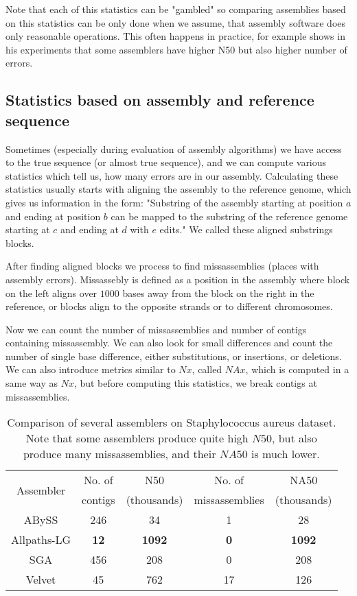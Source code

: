 Note that each of this statistics can be "gambled" so comparing assemblies based
on this statistics can be only done when we assume, that assembly software does only
reasonable operations. This often happens in practice, for example
\citet{gage} shows in his experiments that some assemblers have
higher N50 but also higher number of errors. 

\subsection{Statistics based on assembly and reference sequence}

Sometimes (especially during evaluation of assembly algorithms) we have access to 
the true sequence
(or almost true sequence), and we can compute various statistics which tell us, how many
errors are in our assembly.
Calculating these statistics usually starts with aligning the assembly to the
reference genome, which
gives us information in the form:
"Substring of the assembly starting at position $a$ and ending at position $b$ can be mapped
to the substring of the reference genome starting at $c$ and ending at $d$ with $e$ edits."
We called these aligned substrings blocks. 

After finding aligned blocks we process to find missassemblies (places with assembly errors).
Missassebly \citep{Quast} is defined as a position in the assembly where block on the left
aligns over $1000$ bases away from the block on the right in the reference,
or blocks align to the opposite strands or to different chromosomes.

Now we can count the number of missassemblies and number of contigs containing missassembly.
We can also look for small differences and count the number of single base difference, either
substitutions, or insertions, or deletions. 
We can also introduce metrics similar to $Nx$, called $NAx$, which is computed in a same way
as $Nx$, but before computing this statistics, we break contigs at missassemblies.

\begin{table}
\centering
\begin{tabular}{|c|c|c|c|c|}
\hline
\multirow{2}{*}{Assembler} & No. of  & N50        & No. of         & NA50  \\
                           & contigs & (thousands)& missassemblies & (thousands) \\\hline
ABySS & 246 & 34 & 1 & 28 \\\hline
Allpaths-LG & {\bf 12} & {\bf 1092} & {\bf 0} & {\bf 1092} \\\hline
SGA & 456 & 208 & 0 & 208 \\\hline
Velvet & 45 & 762 & 17 & 126 \\\hline
\end{tabular}
\caption{Comparison of several assemblers on Staphylococcus aureus dataset. Note that some
  assemblers produce quite high $N50$, but also produce many missassemblies, and their
$NA50$ is much lower.} 
\label{tab:gage}
\end{table}

